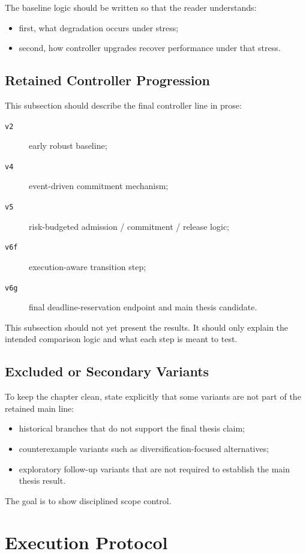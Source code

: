 The baseline logic should be written so that the reader understands:
\begin{itemize}
    \item first, what degradation occurs under stress;
    \item second, how controller upgrades recover performance under that stress.
\end{itemize}

\subsection{Retained Controller Progression}

This subsection should describe the final controller line in prose:
\begin{description}
    \item[\texttt{v2}] early robust baseline;
    \item[\texttt{v4}] event-driven commitment mechanism;
    \item[\texttt{v5}] risk-budgeted admission / commitment / release logic;
    \item[\texttt{v6f}] execution-aware transition step;
    \item[\texttt{v6g}] final deadline-reservation endpoint and main thesis candidate.
\end{description}

This subsection should not yet present the results. It should only explain the intended comparison logic and what each step is meant to test.

\subsection{Excluded or Secondary Variants}

To keep the chapter clean, state explicitly that some variants are not part of the retained main line:
\begin{itemize}
    \item historical branches that do not support the final thesis claim;
    \item counterexample variants such as diversification-focused alternatives;
    \item exploratory follow-up variants that are not required to establish the main thesis result.
\end{itemize}

The goal is to show disciplined scope control.

\section{Execution Protocol}

